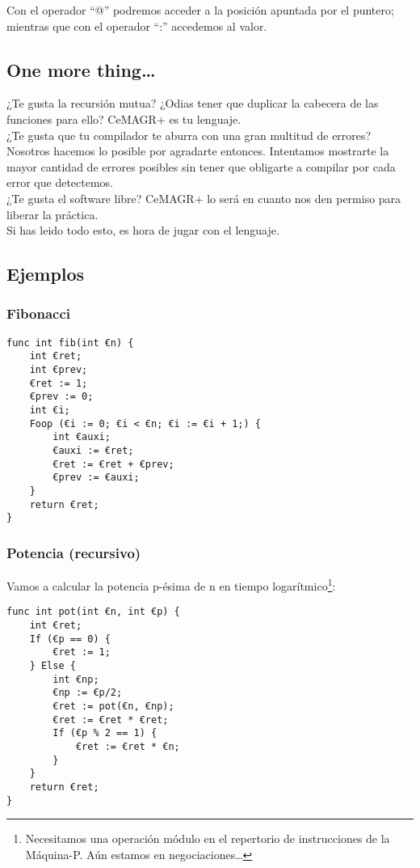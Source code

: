 \documentclass[spanish, a4paper, 12pt] {article}
\newcommand{\lname}[0]{CeMAGR+ }
\begin{document}
Con el operador ``@'' podremos acceder a la posición apuntada por el puntero; mientras que con el operador ``:'' accedemos al valor.

\subsection*{One more thing\ldots}

¿Te gusta la recursión mutua? ¿Odias tener que duplicar la cabecera de las funciones para ello? \lname es tu lenguaje.\\

¿Te gusta que tu compilador te aburra con una gran multitud de errores? Nosotros hacemos lo posible por agradarte entonces. Intentamos mostrarte la mayor cantidad de errores posibles sin tener que obligarte a compilar por cada error que detectemos.\\

¿Te gusta el software libre? \lname lo será en cuanto nos den permiso para liberar la práctica.\\

Si has leido todo esto, es hora de jugar con el lenguaje.

\subsection*{Ejemplos}
\subsubsection*{Fibonacci}
\begin{verbatim}
func int fib(int €n) {
    int €ret;
    int €prev;
    €ret := 1;
    €prev := 0;
    int €i;
    Foop (€i := 0; €i < €n; €i := €i + 1;) {
        int €auxi;
        €auxi := €ret;
        €ret := €ret + €prev;
        €prev := €auxi;
    }
    return €ret;
}
\end{verbatim}
\subsubsection*{Potencia (recursivo)}
Vamos a calcular la potencia p-ésima de n en tiempo logarítmico\footnote{Necesitamos una operación módulo en el repertorio de instrucciones de la Máquina-P. Aún estamos en negociaciones\ldots}:
\begin{verbatim}
func int pot(int €n, int €p) {
    int €ret;
    If (€p == 0) {
        €ret := 1;
    } Else {
        int €np;
        €np := €p/2;
        €ret := pot(€n, €np);
        €ret := €ret * €ret;
        If (€p % 2 == 1) {
            €ret := €ret * €n;
        }
    }
    return €ret;
}
\end{verbatim}
\end{document}
